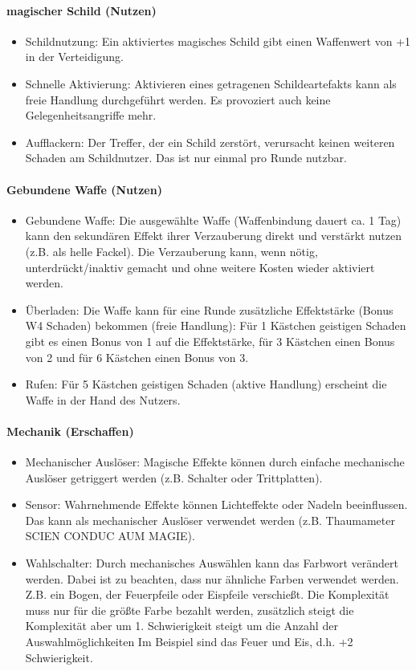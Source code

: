 \documentclass{article}
\begin{document}
\paragraph{magischer Schild (Nutzen)}

\begin{itemize}
\item Schildnutzung: Ein aktiviertes magisches Schild gibt einen Waffenwert von +1 in der Verteidigung.
\item Schnelle Aktivierung: Aktivieren eines getragenen Schildeartefakts kann als freie Handlung durchgeführt werden. Es provoziert auch keine Gelegenheitsangriffe mehr.
\item Aufflackern: Der Treffer, der ein Schild zerstört, verursacht keinen weiteren Schaden am Schildnutzer. Das ist nur einmal pro Runde nutzbar.
\end{itemize}

\paragraph{Gebundene Waffe (Nutzen)}

\begin{itemize}
\item Gebundene Waffe: Die ausgewählte Waffe (Waffenbindung dauert ca. 1 Tag) kann den sekundären Effekt ihrer Verzauberung direkt und verstärkt nutzen (z.B. als helle Fackel). Die Verzauberung kann, wenn nötig, unterdrückt/inaktiv gemacht und ohne weitere Kosten wieder aktiviert werden.
\item Überladen: Die Waffe kann für eine Runde zusätzliche Effektstärke (Bonus W4 Schaden) bekommen (freie Handlung): Für 1 Kästchen geistigen Schaden gibt es einen Bonus von 1 auf die Effektstärke, für 3 Kästchen einen Bonus von 2 und für 6 Kästchen einen Bonus von 3.
\item Rufen: Für 5 Kästchen geistigen Schaden (aktive Handlung) erscheint die Waffe in der Hand des Nutzers.
\end{itemize}

\paragraph{Mechanik (Erschaffen)}

\begin{itemize}
\item Mechanischer Auslöser: Magische Effekte können durch einfache mechanische Auslöser getriggert werden (z.B. Schalter oder Trittplatten).
\item Sensor: Wahrnehmende Effekte können Lichteffekte oder Nadeln beeinflussen. Das kann als mechanischer Auslöser verwendet werden (z.B. Thaumameter SCIEN CONDUC AUM MAGIE).
\item Wahlschalter: Durch mechanisches Auswählen kann das Farbwort verändert werden. Dabei ist zu beachten, dass nur ähnliche Farben verwendet werden. Z.B. ein Bogen, der Feuerpfeile oder Eispfeile verschießt. Die Komplexität muss nur für die größte Farbe bezahlt werden, zusätzlich steigt die Komplexität aber um 1. Schwierigkeit steigt um die Anzahl der Auswahlmöglichkeiten  Im Beispiel sind das Feuer und Eis, d.h. +2 Schwierigkeit.
\end{itemize}
\end{document}
